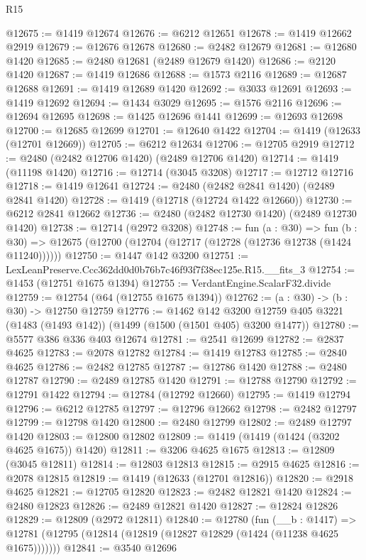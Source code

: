 \begin{lexlean}{R15}
\begin{coremodule}
@12675 := @1419 @12674
@12676 := @6212 @12651
@12678 := @1419 @12662 @2919
@12679 := @12676 @12678
@12680 := @2482 @12679
@12681 := @12680 @1420
@12685 := @2480 @12681 (@2489 @12679 @1420)
@12686 := @2120 @1420
@12687 := @1419 @12686
@12688 := @1573 @2116
@12689 := @12687 @12688
@12691 := @1419 @12689 @1420
@12692 := @3033 @12691
@12693 := @1419 @12692
@12694 := @1434 @3029
@12695 := @1576 @2116
@12696 := @12694 @12695
@12698 := @1425 @12696 @1441
@12699 := @12693 @12698
@12700 := @12685 @12699
@12701 := @12640 @1422
@12704 := @1419 (@12633 (@12701 @12669))
@12705 := @6212 @12634
@12706 := @12705 @2919
@12712 := @2480 (@2482 @12706 @1420) (@2489 @12706 @1420)
@12714 := @1419 (@11198 @1420)
@12716 := @12714 (@3045 @3208)
@12717 := @12712 @12716
@12718 := @1419 @12641
@12724 := @2480 (@2482 @2841 @1420) (@2489 @2841 @1420)
@12728 := @1419 (@12718 (@12724 @1422 @12660))
@12730 := @6212 @2841 @12662
@12736 := @2480 (@2482 @12730 @1420) (@2489 @12730 @1420)
@12738 := @12714 (@2972 @3208)
@12748 := fun (a : @30) =>
  fun (b : @30) => @12675 (@12700 (@12704 (@12717 (@12728 (@12736 @12738 (@1424 @11240))))))
@12750 := @1447 @142 @3200
@12751 := LexLeanPreserve.Ccc362dd0d0b76b7c46f93f7f38ec125e.R15.__fits_3
@12754 := @1453 (@12751 @1675 @1394)
@12755 := VerdantEngine.ScalarF32.divide
@12759 := @12754 (@64 (@12755 @1675 @1394))
@12762 := (a : @30) -> (b : @30) -> @12750 @12759
@12776 := @1462
    @142
    @3200
    @12759
    @405
    @3221
    (@1483 (@1493 @142))
    (@1499 (@1500 (@1501 @405) @3200 @1477))
@12780 := @5577 @386 @336 @403 @12674
@12781 := @2541 @12699
@12782 := @2837 @4625
@12783 := @2078 @12782
@12784 := @1419 @12783
@12785 := @2840 @4625
@12786 := @2482 @12785
@12787 := @12786 @1420
@12788 := @2480 @12787
@12790 := @2489 @12785 @1420
@12791 := @12788 @12790
@12792 := @12791 @1422
@12794 := @12784 (@12792 @12660)
@12795 := @1419 @12794
@12796 := @6212 @12785
@12797 := @12796 @12662
@12798 := @2482 @12797
@12799 := @12798 @1420
@12800 := @2480 @12799
@12802 := @2489 @12797 @1420
@12803 := @12800 @12802
@12809 := @1419 (@1419 (@1424 (@3202 @4625 @1675)) @1420)
@12811 := @3206 @4625 @1675
@12813 := @12809 (@3045 @12811)
@12814 := @12803 @12813
@12815 := @2915 @4625
@12816 := @2078 @12815
@12819 := @1419 (@12633 (@12701 @12816))
@12820 := @2918 @4625
@12821 := @12705 @12820
@12823 := @2482 @12821 @1420
@12824 := @2480 @12823
@12826 := @2489 @12821 @1420
@12827 := @12824 @12826
@12829 := @12809 (@2972 @12811)
@12840 := @12780
    (fun (__b : @1417) =>
    @12781 (@12795 (@12814 (@12819 (@12827 @12829 (@1424 (@11238 @4625 @1675)))))))
@12841 := @3540 @12696

\end{coremodule}
\end{lexlean}

